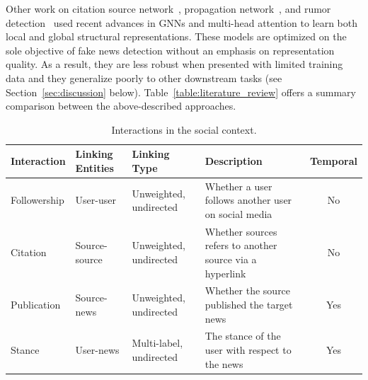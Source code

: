 \documentclass[sigconf,anonymous]{acmart}
\theoremstyle{definition}
\theoremstyle{hypothesis}
\begin{document}
Other work on citation source network~\cite{kulkarni2018multi}, propagation network~\cite{monti2019fake}, and rumor detection~\cite{yuan2019jointly} used recent advances in GNNs and multi-head attention to learn both local and global structural representations. 
These models are optimized on the sole objective of fake news detection without an emphasis on representation quality.
As a result, they are less robust when presented with limited training data and they generalize poorly to other downstream tasks (see Section~\ref{sec:discussion} below). 
Table~\ref{table:literature_review} offers a summary comparison between the above-described approaches.\\



\begin{table}[tbh]
  \centering
  \small
  \caption{Interactions in the social context.}
  \begin{tabular}{llllc}
  \toprule
    \bf Interaction & \bf Linking Entities & \bf Linking Type & \bf Description & \bf Temporal \\ 
    \midrule
    Followership & User-user & Unweighted, undirected & Whether a user follows another user on social media & No \\
    Citation & Source-source & Unweighted, undirected & Whether sources refers to another source via a hyperlink & No \\
    Publication & Source-news & Unweighted, undirected & Whether the source published the target news & Yes \\
    Stance & User-news & Multi-label, undirected & The stance of the user with respect to the news & Yes \\ 
    \bottomrule
  \end{tabular}
  \label{table:social_interactions}
\end{table}
\end{document}
